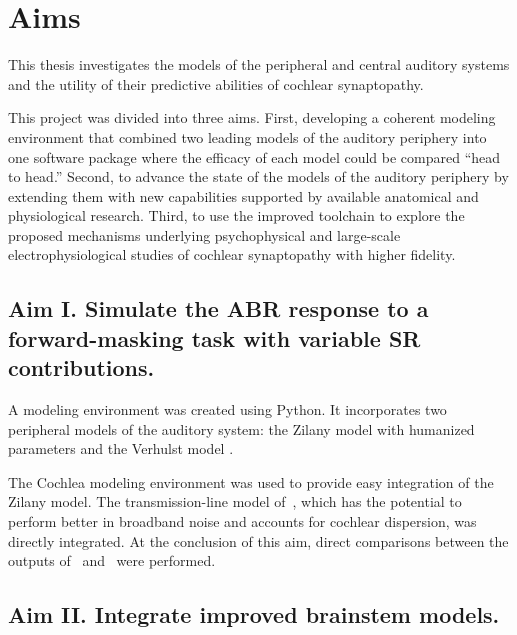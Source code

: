 \chapter{Aims}
\label{chapter:Aims}
\thispagestyle{myheadings}

\graphicspath{{3_Aims/Figures/}}

This thesis investigates the models of the peripheral and central auditory systems and the utility of their predictive abilities of cochlear synaptopathy. 

This project was divided into three aims.  First, developing a coherent modeling environment that combined two leading models of the auditory periphery into one software package where the efficacy of each model could be compared ``head to head.''  Second, to advance the state of the models of the auditory periphery by extending them with new capabilities supported by available anatomical and physiological research.  Third, to use the improved toolchain to explore the proposed mechanisms underlying psychophysical and large-scale electrophysiological studies of cochlear synaptopathy with higher fidelity.


\section{Aim I. Simulate the ABR response to a forward-masking task with variable SR contributions.}
A modeling environment was created using Python.  It incorporates two peripheral models of the auditory system: the Zilany model with humanized parameters \citep{Zilany2014Updated} and the Verhulst model \citep{Verhulst2015Functional}.  

The Cochlea modeling environment \citep{Rudnicki2014Cochlea} was used to provide easy integration of the Zilany model. The transmission-line model of~\cite{Verhulst2015Functional}, which has the potential to perform better in broadband noise and accounts for cochlear dispersion, was directly integrated.
At the conclusion of this aim, direct comparisons between the outputs of~\cite{Zilany2014Updated} and~\cite{Verhulst2015Functional} were performed.

\section{Aim II. Integrate improved brainstem models.}  

